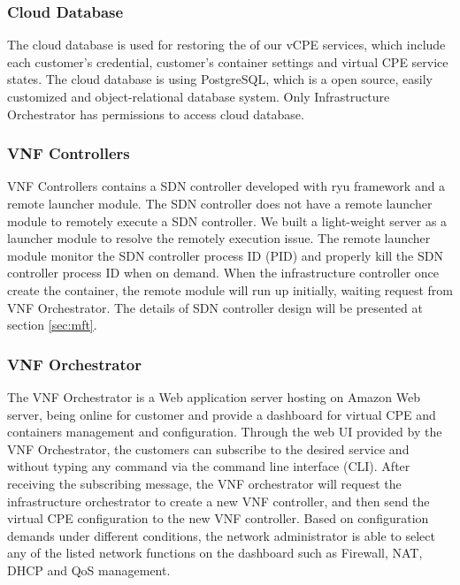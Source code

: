 \documentclass[journal]{IEEEtran}
\begin{document}
\subsubsection{Cloud Database}

The cloud database is used for restoring the of our vCPE services, which include each customer’s credential, customer’s container settings and virtual CPE service states. The cloud database is using PostgreSQL, which is a open source, easily customized and object-relational database system. Only Infrastructure Orchestrator has permissions to access cloud database.

\subsubsection{VNF Controllers}

VNF Controllers contains a SDN controller developed with ryu framework \cite{web:ryu} and a remote launcher module. The SDN controller does not have a remote launcher module to remotely execute a SDN controller. We built a light-weight server as a launcher module to resolve the remotely execution issue. The remote launcher module monitor the SDN controller process ID (PID) and properly kill the SDN controller process ID when on demand. When the infrastructure controller once create the container, the remote module will run up initially, waiting request from VNF Orchestrator. The details of SDN controller design will be presented at section \ref{sec:mft}.

\subsubsection{VNF Orchestrator}

The VNF Orchestrator is a Web application server hosting on Amazon Web server, being online for customer and provide a dashboard for virtual CPE and containers management and configuration.
Through the web UI provided by the VNF Orchestrator, the customers can subscribe to the desired service and without typing any command via the command line interface (CLI). After receiving the subscribing message, the VNF orchestrator will request the infrastructure orchestrator to create a new VNF controller, and then send the virtual CPE configuration to the new VNF controller. Based on configuration demands under different conditions, the network administrator is able to select any of the listed network functions on the dashboard such as Firewall, NAT, DHCP and QoS management.
\end{document}
